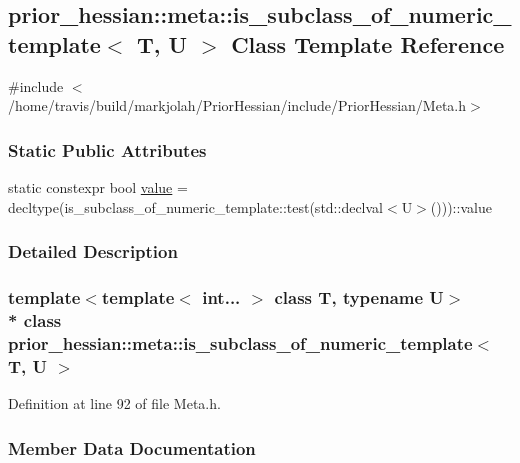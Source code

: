 \hypertarget{classprior__hessian_1_1meta_1_1is__subclass__of__numeric__template}{}\subsection{prior\+\_\+hessian\+:\+:meta\+:\+:is\+\_\+subclass\+\_\+of\+\_\+numeric\+\_\+template$<$ T, U $>$ Class Template Reference}
\label{classprior__hessian_1_1meta_1_1is__subclass__of__numeric__template}


{\ttfamily \#include $<$/home/travis/build/markjolah/\+Prior\+Hessian/include/\+Prior\+Hessian/\+Meta.\+h$>$}

\subsubsection*{Static Public Attributes}
\begin{DoxyCompactItemize}
\item 
static constexpr bool \hyperlink{classprior__hessian_1_1meta_1_1is__subclass__of__numeric__template_a42ab6357020f653442004e834c93a6dd}{value} = decltype(is\+\_\+subclass\+\_\+of\+\_\+numeric\+\_\+template\+::test(std\+::declval$<$U$>$()))\+::value
\end{DoxyCompactItemize}


\subsubsection{Detailed Description}
\subsubsection*{template$<$template$<$ int... $>$ class T, typename U$>$\\*
class prior\+\_\+hessian\+::meta\+::is\+\_\+subclass\+\_\+of\+\_\+numeric\+\_\+template$<$ T, U $>$}



Definition at line 92 of file Meta.\+h.



\subsubsection{Member Data Documentation}
